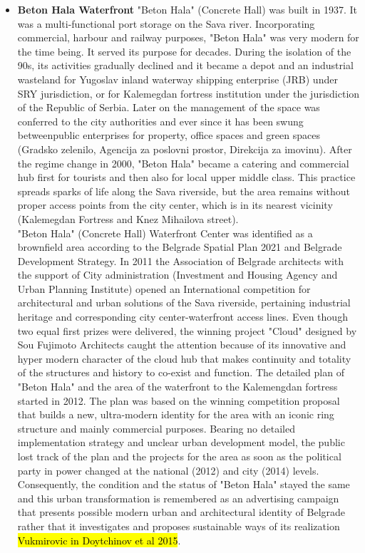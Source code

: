 \documentclass[11pt]{report}
\begin{document}
\begin{itemize}
\item \textbf{Beton Hala Waterfront}
"Beton Hala" (Concrete Hall) was built in 1937. It was a multi-functional port storage on the Sava river. Incorporating commercial, harbour and railway purposes, "Beton Hala" was very modern for the time being. It served its purpose for decades. During the isolation of the 90s, its activities gradually declined and it became a depot and an industrial wasteland for Yugoslav inland waterway shipping enterprise (JRB) under SRY jurisdiction, or for Kalemegdan fortress institution under the jurisdiction of the Republic of Serbia. Later on the management of the space was conferred to the city authorities and ever since it has been swung betweenpublic enterprises for property, office spaces and green spaces (Gradsko zelenilo, Agencija za poslovni prostor, Direkcija za imovinu). After the regime change in 2000, "Beton Hala" became a catering and commercial hub first for tourists and then also for local upper middle class. This practice spreads sparks of life along the Sava riverside, but the area remains without proper access points from the city center, which is in its nearest vicinity (Kalemegdan Fortress and Knez Mihailova street).
\\
"Beton Hala" (Concrete Hall) Waterfront Center was identified as a brownfield area according to the Belgrade Spatial Plan 2021 and Belgrade Development Strategy. In 2011 the Association of Belgrade architects with the support of City administration (Investment and Housing Agency and Urban Planning Institute) opened an International competition for architectural and urban solutions of the Sava riverside, pertaining industrial heritage and corresponding city center-waterfront access lines. Even though two equal first prizes were delivered, the winning project "Cloud"  designed  by  Sou  Fujimoto  Architects caught the attention because of its innovative and hyper modern character of the cloud hub that makes continuity and totality of the structures and history to co-exist and function.
The detailed plan of "Beton Hala"  and the area of the waterfront to the Kalemengdan fortress started  in 2012. The plan was based on the winning competition proposal that builds a new, ultra-modern identity for the area with an iconic ring structure and mainly commercial purposes. Bearing no detailed implementation strategy and unclear urban development model, the public lost track of the plan and the projects for the area as soon as the political party in power changed at the national (2012) and city (2014) levels. Consequently, the condition and the status of "Beton Hala" stayed the same and this urban transformation is remembered as an advertising campaign that presents possible modern urban and architectural identity of Belgrade rather that it investigates and proposes sustainable ways of its realization \hl{Vukmirovic in Doytchinov et al 2015}.


\end{itemize}
\end{document}
